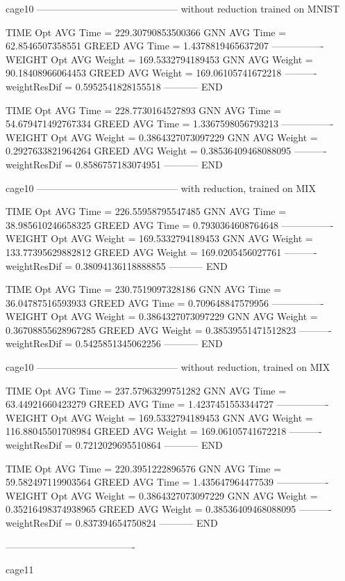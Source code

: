 cage10 
--------------------------------------------
without reduction trained on MNIST

TIME
Opt AVG Time =  229.30790853500366
GNN AVG Time =  62.8546507358551
GREED AVG Time =  1.4378819465637207
----------------
WEIGHT
Opt AVG Weight =  169.5332794189453
GNN AVG Weight =  90.18408966064453
GREED AVG Weight =  169.06105741672218
----------
weightResDif =  0.5952541828155518
-----------
END

TIME
Opt AVG Time =  228.7730164527893
GNN AVG Time =  54.679471492767334
GREED AVG Time =  1.3367598056793213
----------------
WEIGHT
Opt AVG Weight =  0.3864327073097229
GNN AVG Weight =  0.2927633821964264
GREED AVG Weight =  0.38536409468088095
----------
weightResDif =  0.8586757183074951
-----------
END

cage10 
--------------------------------------------
with reduction, trained on MIX

TIME
Opt AVG Time =  226.55958795547485
GNN AVG Time =  38.985610246658325
GREED AVG Time =  0.7930364608764648
----------------
WEIGHT
Opt AVG Weight =  169.5332794189453
GNN AVG Weight =  133.77395629882812
GREED AVG Weight =  169.0205456027761
----------
weightResDif =  0.38094136118888855
-----------
END

TIME
Opt AVG Time =  230.7519097328186
GNN AVG Time =  36.04787516593933
GREED AVG Time =  0.709648847579956
----------------
WEIGHT
Opt AVG Weight =  0.3864327073097229
GNN AVG Weight =  0.36708855628967285
GREED AVG Weight =  0.38539551471512823
----------
weightResDif =  0.5425851345062256
-----------
END

cage10 
--------------------------------------------
without reduction, trained on MIX

TIME
Opt AVG Time =  237.57963299751282
GNN AVG Time =  63.44921660423279
GREED AVG Time =  1.4237451553344727
----------------
WEIGHT
Opt AVG Weight =  169.5332794189453
GNN AVG Weight =  116.88045501708984
GREED AVG Weight =  169.06105741672218
----------
weightResDif =  0.7212029695510864
-----------
END

TIME
Opt AVG Time =  220.3951222896576
GNN AVG Time =  59.582497119903564
GREED AVG Time =  1.435647964477539
----------------
WEIGHT
Opt AVG Weight =  0.3864327073097229
GNN AVG Weight =  0.35216498374938965
GREED AVG Weight =  0.38536409468088095
----------
weightResDif =  0.837394654750824
-----------
END


----------------------------------------

cage11  

